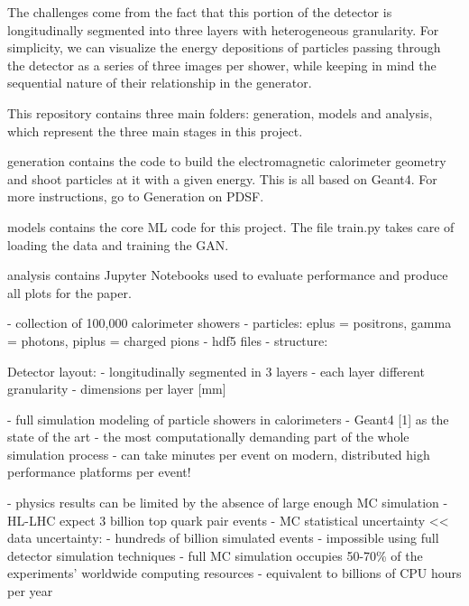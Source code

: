 The challenges come from the fact that this portion of the detector is
longitudinally segmented into three layers with heterogeneous granularity. For
simplicity, we can visualize the energy depositions of particles passing through
the detector as a series of three images per shower, while keeping in mind the
sequential nature of their relationship in the generator.

This repository contains three main folders: generation, models and analysis,
which represent the three main stages in this project.

generation contains the code to build the electromagnetic calorimeter geometry
and shoot particles at it with a given energy. This is all based on Geant4. For
more instructions, go to Generation on PDSF.

models contains the core ML code for this project. The file train.py takes care
of loading the data and training the GAN.

analysis contains Jupyter Notebooks used to evaluate performance and produce all
plots for the paper.



- collection of 100,000 calorimeter showers - particles: eplus = positrons,
gamma = photons, piplus = charged pions - hdf5 files - structure:


Detector layout: - longitudinally segmented in 3 layers - each layer different
granularity - dimensions per layer [mm]



- full simulation modeling of particle showers in calorimeters - Geant4 [1] as
the state of the art - the most computationally demanding part of the whole
simulation process - can take minutes per event on modern, distributed high
performance platforms per event!

- physics results can be limited by the absence of large enough MC simulation -
HL-LHC expect 3 billion top quark pair events - MC statistical uncertainty <<
data uncertainty: - hundreds of billion simulated events - impossible using full
detector simulation techniques - full MC simulation occupies 50-70\% of the
experiments’ worldwide computing resources - equivalent to billions of CPU hours
per year

